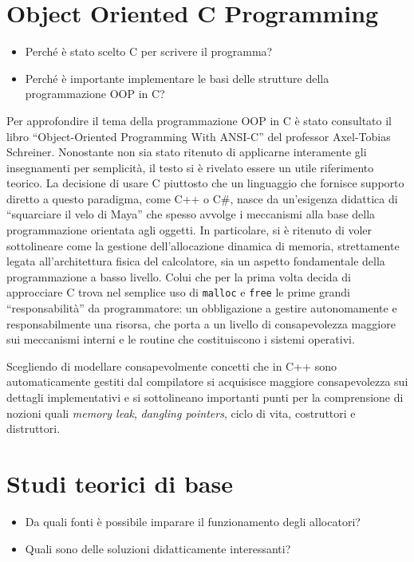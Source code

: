 \documentclass[noexaminfo]{sapthesis}
\begin{document}
\section{Object Oriented C Programming}
\begin{itemize}
  \item Perché è stato scelto C per scrivere il programma?
  \item Perché è importante implementare le basi delle strutture della programmazione OOP in C?
\end{itemize}

Per approfondire il tema della programmazione OOP in C è stato consultato il libro ``Object-Oriented Programming With ANSI-C'' del professor Axel-Tobias Schreiner. Nonostante non sia stato ritenuto di applicarne interamente gli insegnamenti per semplicità, il testo si è rivelato essere un utile riferimento teorico. La decisione di usare C piuttosto che un linguaggio che fornisce supporto diretto a questo paradigma, come C++ o C\#, nasce da un’esigenza didattica di ``squarciare il velo di Maya'' che spesso avvolge i meccanismi alla base della programmazione orientata agli oggetti. In particolare, si è ritenuto di voler sottolineare come la gestione dell’allocazione dinamica di memoria, strettamente legata all’architettura fisica del calcolatore, sia un aspetto fondamentale della programmazione a basso livello. Colui che per la prima volta decida di approcciare C trova nel semplice uso di \texttt{malloc} e \texttt{free} le prime grandi ``responsabilità'' da programmatore: un obbligazione a gestire autonomamente e responsabilmente una risorsa, che porta a un livello di consapevolezza maggiore sui meccanismi interni e le routine che costituiscono i sistemi operativi.

Scegliendo di modellare consapevolmente concetti che in C++ sono automaticamente gestiti dal compilatore si acquisisce maggiore consapevolezza sui dettagli implementativi e si sottolineano importanti punti per la comprensione di nozioni quali \textit{memory leak}, \textit{dangling pointers}, ciclo di vita, costruttori e distruttori.

\section{Studi teorici di base}
\begin{itemize}
  \item Da quali fonti è possibile imparare il funzionamento degli allocatori?
  \item Quali sono delle soluzioni didatticamente interessanti?
\end{itemize}
\end{document}
